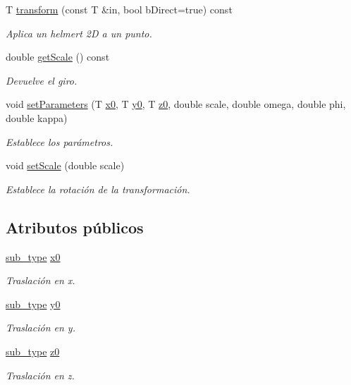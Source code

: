 \begin{DoxyCompactItemize}
T \hyperlink{group__trf3_d_group_ga89bec3a231cf507d5cdc093c7e7993c8}{transform} (const T \&in, bool b\+Direct=true) const 
\begin{DoxyCompactList}\small\item\em Aplica un helmert 2D a un punto. \end{DoxyCompactList}\item 
double \hyperlink{class_i3_d_1_1_helmert3_d_ab5dd94b9b90cc0ed841e765b9f59e7e3}{get\+Scale} () const 
\begin{DoxyCompactList}\small\item\em Devuelve el giro. \end{DoxyCompactList}\item 
void \hyperlink{group__trf3_d_group_gaed99a04af4bbb2c8d4ceaf3ec8652a71}{set\+Parameters} (T \hyperlink{class_i3_d_1_1_helmert3_d_a57421e1c701909b5a319dfeaba50fe20}{x0}, T \hyperlink{class_i3_d_1_1_helmert3_d_a8367d52bdb3d60a015e9c30ce7ccacde}{y0}, T \hyperlink{class_i3_d_1_1_helmert3_d_aaa4da06457bac6b987d41a93b9d29d1e}{z0}, double scale, double omega, double phi, double kappa)
\begin{DoxyCompactList}\small\item\em Establece los parámetros. \end{DoxyCompactList}\item 
void \hyperlink{group__trf3_d_group_ga67cdef21b9fed12ef337833793028d15}{set\+Scale} (double scale)
\begin{DoxyCompactList}\small\item\em Establece la rotación de la transformación. \end{DoxyCompactList}\end{DoxyCompactItemize}
\subsection*{Atributos públicos}
\begin{DoxyCompactItemize}
\item 
\hyperlink{class_i3_d_1_1_transform_ac087b4b8b9acb1b11a6caa2231d598c7}{sub\+\_\+type} \hyperlink{class_i3_d_1_1_helmert3_d_a57421e1c701909b5a319dfeaba50fe20}{x0}
\begin{DoxyCompactList}\small\item\em Traslación en x. \end{DoxyCompactList}\item 
\hyperlink{class_i3_d_1_1_transform_ac087b4b8b9acb1b11a6caa2231d598c7}{sub\+\_\+type} \hyperlink{class_i3_d_1_1_helmert3_d_a8367d52bdb3d60a015e9c30ce7ccacde}{y0}
\begin{DoxyCompactList}\small\item\em Traslación en y. \end{DoxyCompactList}\item 
\hyperlink{class_i3_d_1_1_transform_ac087b4b8b9acb1b11a6caa2231d598c7}{sub\+\_\+type} \hyperlink{class_i3_d_1_1_helmert3_d_aaa4da06457bac6b987d41a93b9d29d1e}{z0}
\begin{DoxyCompactList}\small\item\em Traslación en z. \end{DoxyCompactList}\end{DoxyCompactItemize}

